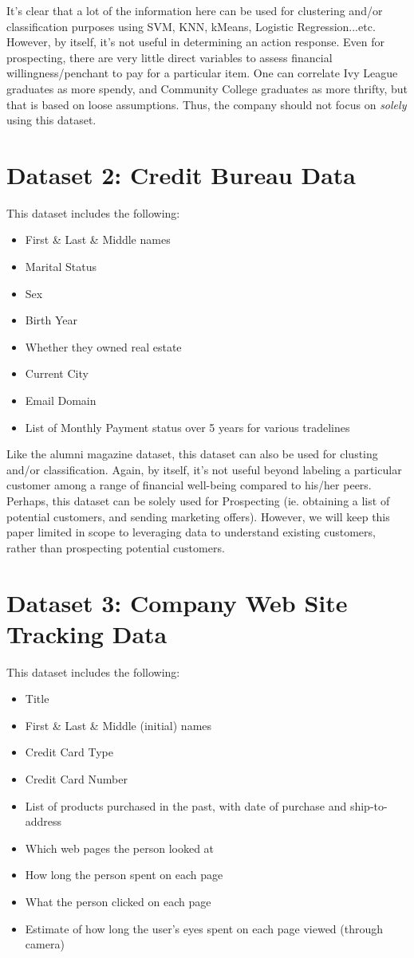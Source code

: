 \documentclass[letterpaper,12pt]{article}
\begin{document}
It's clear that a lot of the information here can be used for clustering and/or classification purposes using SVM, KNN, kMeans, Logistic Regression...etc.  However, by itself, it's not useful in determining an action response.  Even for prospecting, there are very little direct variables to assess financial willingness/penchant to pay for a particular item.  One can correlate Ivy League graduates as more spendy, and Community College graduates as more thrifty, but that is based on loose assumptions.  Thus, the company should not focus on \emph{solely} using this dataset.


\section{Dataset 2:  Credit Bureau Data}
This dataset includes the following:

\begin{itemize}
\item First \& Last \& Middle names
\item Marital Status
\item Sex
\item Birth Year
\item Whether they owned real estate
\item Current City
\item Email Domain
\item List of Monthly Payment status over 5 years for various tradelines
\end{itemize}

Like the alumni magazine dataset, this dataset can also be used for clusting and/or classification.  Again, by itself, it's not useful beyond labeling a particular customer among a range of financial well-being compared to his/her peers.  Perhaps, this dataset can be solely used for Prospecting (ie. obtaining a list of potential customers, and sending marketing offers).  However, we will keep this paper limited in scope to leveraging data to understand existing customers, rather than prospecting potential customers.  

\section{Dataset 3: Company Web Site Tracking Data}
This dataset includes the following:

\begin{itemize}
\item Title
\item First \& Last \& Middle (initial) names
\item Credit Card Type
\item Credit Card Number
\item List of products purchased in the past, with date of purchase and ship-to-address
\item Which web pages the person looked at
\item How long the person spent on each page
\item What the person clicked on each page
\item Estimate of how long the user's eyes spent on each page viewed (through camera)
\end{itemize}
\end{document}
